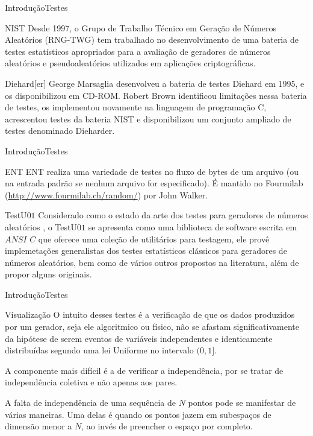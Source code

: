 \documentclass[10pt,xcolor={dvipsnames}]{beamer}
\begin{document}
\begin{frame}{Introdução}{Testes}
\pause
\begin{block}{NIST}
	Desde 1997, o Grupo de Trabalho Técnico em Geração de Números Aleatórios (RNG-TWG) tem trabalhado no desenvolvimento de uma bateria de testes estatísticos apropriados para a avaliação de geradores de números aleatórios e pseudoaleatórios utilizados em aplicações criptográficas.
\end{block}
\pause
\begin{block}{Diehard[er]}
	George Marsaglia desenvolveu a bateria de testes Diehard em 1995, e os disponibilizou em CD-ROM.
	Robert Brown identificou limitações nessa bateria de testes, os implementou novamente na linguagem de programação C, acrescentou testes da bateria NIST e disponibilizou um conjunto ampliado de testes denominado Dieharder.
\end{block}	
\end{frame}

\begin{frame}{Introdução}{Testes}
\pause
\begin{block}{ENT}
	ENT \cite{ENTTestSuite} realiza uma variedade de testes no fluxo de bytes de um arquivo (ou na entrada padrão se nenhum arquivo for especificado). É mantido no Fourmilab (\url{http://www.fourmilab.ch/random/}) por John Walker.
\end{block}
\pause
\begin{block}{TestU$01$}
	Considerado como o estado da arte dos testes para geradores de números aleatórios \cite{LEcuyer:07}, o TestU$01$ se apresenta como uma biblioteca de software escrita em $ANSI$ $C$ que oferece uma coleção de utilitários para testagem, ele provê implemetações generalistas dos testes estatísticos clássicos para geradores de números aleatórios, bem como de vários outros propostos na literatura, além de propor alguns originais.
\end{block}	
\end{frame}

\begin{frame}{Introdução}{Testes}
\pause
\begin{block}{Visualização}
	O intuito desses testes é a verificação de que os dados produzidos por um gerador, seja ele algoritmico ou físico, não se afastam significativamente da hipótese de serem eventos de variáveis independentes e identicamente distribuídas segundo uma lei Uniforme no intervalo $(0,1]$.
\pause	
	
	A componente mais difícil é a de verificar a independência, por se tratar de independência coletiva e não apenas aos pares.
\pause
	
	A falta de independência de uma sequência de $N$ pontos pode se manifestar de várias maneiras.
	Uma delas é quando os pontos jazem em subespaços de dimensão menor a $N$, ao invés de preencher o espaço por completo.
\end{block}
\end{frame}
\end{document}
